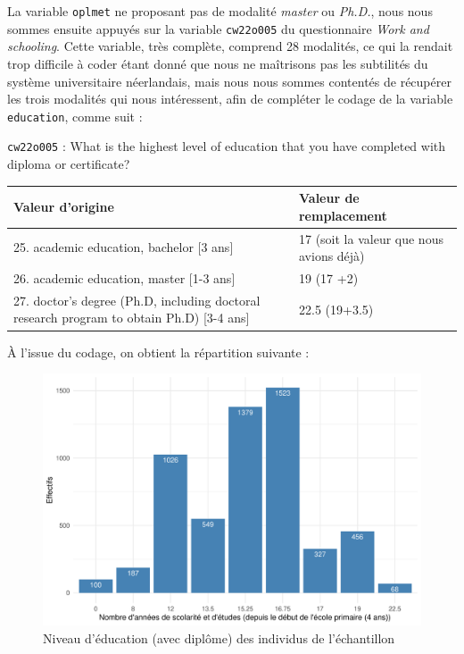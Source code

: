 \documentclass[a4paper, french, 11 pt]{article}\usepackage[]{graphicx}\usepackage[]{xcolor}
\begin{document}
La variable \texttt{oplmet} ne proposant pas de modalité \textit{master} ou \textit{Ph.D.}, nous nous sommes ensuite appuyés sur la variable \texttt{cw22o005} du questionnaire \textit{Work and schooling}. Cette variable, très complète, comprend 28 modalités, ce qui la rendait trop difficile à coder étant donné que nous ne maîtrisons pas les subtilités du système universitaire néerlandais, mais nous nous sommes contentés de récupérer les trois modalités qui nous intéressent, afin de compléter le codage de la variable \texttt{education}, comme suit : 

\vspace{0,5cm}
\begin{minipage}{0,8\linewidth}
{\footnotesize\texttt{cw22o005} : What is the highest level of education that you have completed with diploma or certificate?
\vspace{0,2cm}

\begin{tabular}{m{0,5\linewidth}m{0,5\linewidth}}
\hline
Valeur d'origine & Valeur de remplacement \\
\hline
25. academic education, bachelor [3 ans] & 17 (soit la valeur que nous avions déjà) \\
26. academic education, master [1-3 ans] & 19 (17 +2) \\
27. doctor's degree (Ph.D, including doctoral research program to obtain Ph.D) [3-4 ans] & 22.5 (19+3.5) \\
\hline
\end{tabular}}
\end{minipage}
\vspace{0,3cm}

À l'issue du codage, on obtient la répartition suivante : 

\begin{figure}[h]
\center
\includegraphics[width=0.7\linewidth]{figure/educ.pdf}
\caption{Niveau d'éducation (avec diplôme) des individus de l'échantillon}
\end{figure}
\end{document}
